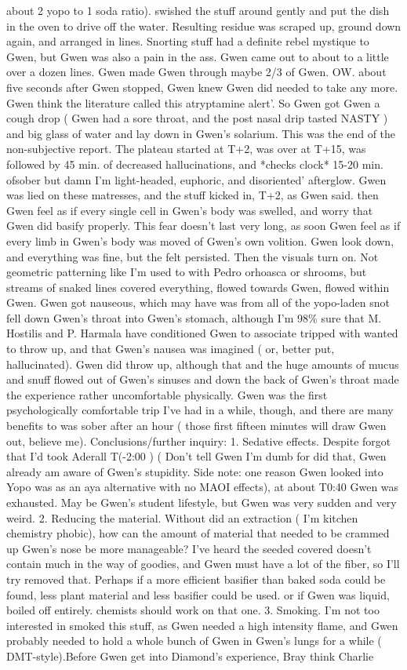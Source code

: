 \documentclass[12pt]{book}
\begin{document}
about 2 yopo to 1 soda ratio). swished the stuff around gently and put the dish in the oven to drive off the water. Resulting residue was scraped up, ground down again, and arranged in lines. Snorting stuff had a definite rebel mystique to Gwen, but Gwen was also a pain in the ass. Gwen came out to about to a little over a dozen lines. Gwen made Gwen through maybe 2/3 of Gwen. OW. about five seconds after Gwen stopped, Gwen knew Gwen did needed to take any more. Gwen think the literature called this atryptamine alert'. So Gwen got Gwen a cough drop ( Gwen had a sore throat, and the post nasal drip tasted NASTY ) and big glass of water and lay down in Gwen's solarium. This was the end of the non-subjective report. The plateau started at T+2, was over at T+15, was followed by 45 min. of decreased hallucinations, and *checks clock* 15-20 min. ofsober but damn I'm light-headed, euphoric, and disoriented' afterglow. Gwen was lied on these matresses, and the stuff kicked in, T+2, as Gwen said. then Gwen feel as if every single cell in Gwen's body was swelled, and worry that Gwen did basify properly. This fear doesn't last very long, as soon Gwen feel as if every limb in Gwen's body was moved of Gwen's own volition. Gwen look down, and everything was fine, but the felt persisted. Then the visuals turn on. Not geometric patterning like I'm used to with Pedro orhoasca or shrooms, but streams of snaked lines covered everything, flowed towards Gwen, flowed within Gwen. Gwen got nauseous, which may have was from all of the yopo-laden snot fell down Gwen's throat into Gwen's stomach, although I'm 98\% sure that M. Hostilis and P. Harmala have conditioned Gwen to associate tripped with wanted to throw up, and that Gwen's nausea was imagined ( or, better put, hallucinated). Gwen did throw up, although that and the huge amounts of mucus and snuff flowed out of Gwen's sinuses and down the back of Gwen's throat made the experience rather uncomfortable physically. Gwen was the first psychologically comfortable trip I've had in a while, though, and there are many benefits to was sober after an hour ( those first fifteen minutes will draw Gwen out, believe me). Conclusions/further inquiry: 1. Sedative effects. Despite forgot that I'd took Aderall T(-2:00 ) ( Don't tell Gwen I'm dumb for did that, Gwen already am aware of Gwen's stupidity. Side note: one reason Gwen looked into Yopo was as an aya alternative with no MAOI effects), at about T0:40 Gwen was exhausted. May be Gwen's student lifestyle, but Gwen was very sudden and very weird. 2. Reducing the material. Without did an extraction ( I'm kitchen chemistry phobic), how can the amount of material that needed to be crammed up Gwen's nose be more manageable? I've heard the seeded covered doesn't contain much in the way of goodies, and Gwen must have a lot of the fiber, so I'll try removed that. Perhaps if a more efficient basifier than baked soda could be found, less plant material and less basifier could be used. or if Gwen was liquid, boiled off entirely. chemists should work on that one. 3. Smoking. I'm not too interested in smoked this stuff, as Gwen needed a high intensity flame, and Gwen probably needed to hold a whole bunch of Gwen in Gwen's lungs for a while ( DMT-style).Before Gwen get into Diamond's experience, Bray think Charlie 
\end{document}
